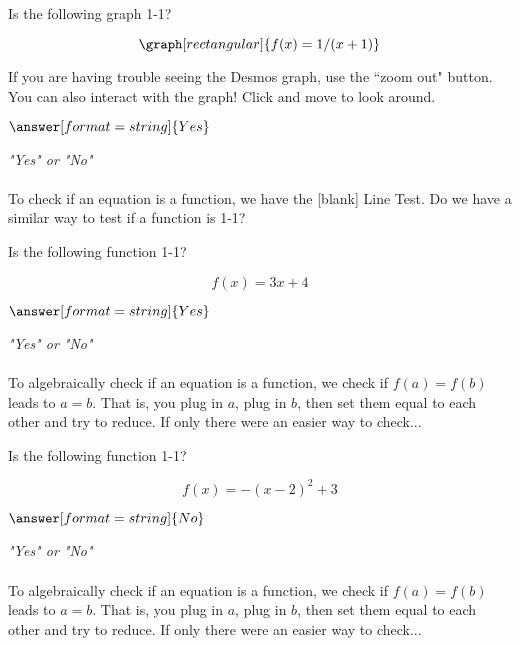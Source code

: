 \documentclass{ximera}
\begin{document}
\begin{question}
Is the following graph 1-1?
 
\[
\graph[rectangular]{f(x) = 1/(x+1)}
\]
 
\begin{feedback}
If you are having trouble seeing the Desmos graph, use the ``zoom out" button. You can also interact with the graph! Click and move to look around.
\end{feedback}
 
$\answer[format=string]{Yes}$
\begin{hint}
\textit{"Yes" or "No"} \\ \\
To check if an equation is a function, we have the [blank] Line Test. Do we have a similar way to test if a function is 1-1?
\end{hint}
 
\end{question}
 
\begin{question}
Is the following function 1-1?
 
$$ f(x) = 3x+4 $$
 
$\answer[format=string]{Yes}$
 
\begin{hint}
\textit{"Yes" or "No"} \\ \\
To algebraically check if an equation is a function, we check if $f(a) = f(b)$ leads to $a = b$. That is, you plug in $a$, plug in $b$, then set them equal to each other and try to reduce. If only there were an easier way to check...
\end{hint}
 
\end{question}
 
\begin{question}
Is the following function 1-1?
 
$$ f(x) = -(x-2)^2+3 $$
 
$\answer[format=string]{No}$
 
\begin{hint}
\textit{"Yes" or "No"} \\ \\
To algebraically check if an equation is a function, we check if $f(a) = f(b)$ leads to $a = b$. That is, you plug in $a$, plug in $b$, then set them equal to each other and try to reduce. If only there were an easier way to check...
\end{hint}
 
\end{question}
 
\end{document}
